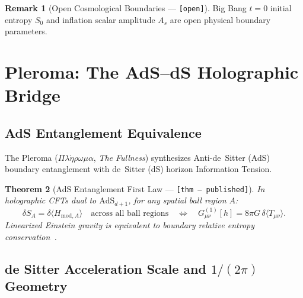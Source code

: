 \documentclass[12pt,letterpaper]{article}
\theoremstyle{plain}
\newtheorem{theorem}{Theorem}[section]
\theoremstyle{definition}
\newtheorem{remark}[theorem]{Remark}
\begin{document}
\begin{remark}[Open Cosmological Boundaries --- {\normalfont\texttt{[open]}}]\label{rem:boundaries}
Big Bang $t=0$ initial entropy $S_0$ and inflation scalar amplitude $A_s$ are open physical boundary parameters.
\end{remark}

\section{Pleroma: The AdS--dS Holographic Bridge}
\label{sec:pleroma}

\subsection{AdS Entanglement Equivalence}

The Pleroma ($\Pi\lambda\acute{\eta}\rho\omega\mu\alpha$, \emph{The Fullness}) synthesizes Anti-de~Sitter (AdS) boundary entanglement with de~Sitter (dS) horizon Information Tension.

\begin{theorem}[AdS Entanglement First Law --- {\normalfont\texttt{[thm --- published]}}]
In holographic CFTs dual to $\mathrm{AdS}_{d+1}$, for any spatial ball region $A$:
\begin{equation}\label{eq:first_law}
  \delta S_A = \delta\langle H_{\mathrm{mod},A}\rangle
  \quad\text{across all ball regions}\quad
  \iff\quad
  G^{(1)}_{\mu\nu}[h] = 8\pi G\,\delta\langle T_{\mu\nu}\rangle.
\end{equation}
Linearized Einstein gravity is equivalent to boundary relative entropy conservation~\cite{2026,fghmvr2014,lmvr2014}.
\end{theorem}

\subsection{de Sitter Acceleration Scale and $1/(2\pi)$ Geometry}
\end{document}
